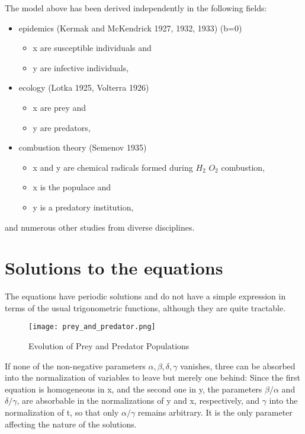 \documentclass{article}
\begin{document}
The model above has been derived independently in the following fields:

\begin{itemize}
\item epidemics (Kermak and McKendrick 1927, 1932, 1933) (b=0)
\begin{itemize}
\item x are susceptible individuals and
\item y are infective individuals,
\end{itemize}

\item ecology (Lotka 1925, Volterra 1926)

\begin{itemize}
\item x are prey and
\item y are predators,
\end{itemize}
\item combustion theory (Semenov 1935)
\begin{itemize}
\item x and y are chemical radicals formed during $H_2$ $O_2$ combustion,
\end{itemize}
\begin{itemize}
\item x is the populace and
\item y is a predatory institution,
\end{itemize}
\end{itemize}

and numerous other studies from diverse disciplines.

\section{Solutions to the equations}
The equations have periodic solutions and do not have a simple expression in terms of the usual trigonometric functions, although they are quite tractable.

\begin{figure}[h]
\begin{center}
\texttt{[image: prey\_and\_predator.png]}
\caption{Evolution of Prey and Predator Populations}\label{fig:1}
\end{center}
\end{figure}

If none of the non-negative parameters $\alpha, \beta, \delta,  \gamma$ vanishes, three can be absorbed into the normalization of variables to leave but merely one behind: Since the first equation is homogeneous in x, and the second one in y, the parameters $\beta / \alpha$ and $\delta / \gamma$, are absorbable in the normalizations of y and x, respectively, and $\gamma$ into the normalization of t, so that only $\alpha / \gamma$ remains arbitrary. It is the only parameter affecting the nature of the solutions.
\end{document}

